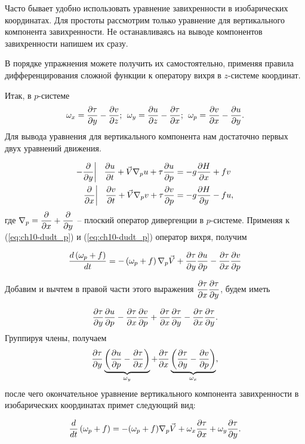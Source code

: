 Часто бывает удобно использовать уравнение завихренности в изобарических координатах. Для простоты рассмотрим только уравнение для вертикального компонента завихренности. Не останавливаясь на выводе компонентов завихренности напишем их сразу. 
\begin{info}В порядке упражнения можете получить их самостоятельно, применяя правила дифференцирования сложной функции к оператору вихря в $z$-системе координат.\end{info}
Итак, в $p$-системе
\begin{equation}
    \omega_x = \pd{\tau}{y}-\pd{v}{z}; \:\: \omega_y = \pd{u}{z}-\pd{\tau}{x}; \:\:\omega_p = \pd{v}{x}-\pd{u}{y}.
\end{equation}
Для вывода уравнения для вертикального компонента нам достаточно первых двух уравнений движения.

\begin{align}
    -\pd{}{y} \bigg| \:\:\:\: \pd{u}{t}+\vec{V}\nabla_pu + \tau\pd{u}{p}&=-g\pd{H}{x}+fv \label{eq:ch10-dudt_p} \\
     \pd{}{x} \bigg| \:\:\:\: \pd{v}{t}+\vec{V}\nabla_pv + \tau\pd{v}{p}&=-g\pd{H}{y}-fu \label{eq:ch10-dudt_p},
\end{align}
где $\nabla_p=\pd{}{x}+\pd{}{y}$ -- плоский оператор дивергенции в $p$-системе. Применяя к (\ref{eq:ch10-dudt_p}) и (\ref{eq:ch10-dudt_p}) оператор вихря, получим

\begin{equation*}
    \td{ \left( \omega_p + f\right) }{t} = - \left( \omega_p+f \right)\nabla_p\vec{V}+\pd{\tau}{y}\pd{u}{p}-\pd{\tau}{x}\pd{v}{p}
\end{equation*}

Добавим и вычтем в правой части этого выражения $\pd{\tau}{x}\pd{\tau}{y}$, будем иметь

\begin{equation*}
    \pd{\tau}{y}\pd{u}{p} - \pd{\tau}{x}\pd{v}{p}+\pd{\tau}{x}\pd{\tau}{y}-\pd{\tau}{x}\pd{\tau}{y}.
\end{equation*}
Группируя члены, получаем
\begin{equation*}
    \pd{\tau}{y} 
    \underbrace{\left(  \pd{u}{p} - \pd{\tau}{x} \right)}_{\omega_y} + 
    \pd{\tau}{x} 
    \underbrace{\left( \pd{\tau}{y}-\pd{v}{p} \right)}_{\omega_x},
\end{equation*}
после чего окончательное уравнение вертикального компонента завихренности в изобарических координатах примет следующий вид: 

\begin{equation}
    \label{eq:ch10-DomegaDt_p}
    \td{}{t} \left( \omega_p + f \right) = -(\omega_p+f)\nabla_p\vec{V} + \omega_x\pd{\tau}{x}+\omega_y\pd{\tau}{y}.
\end{equation}

